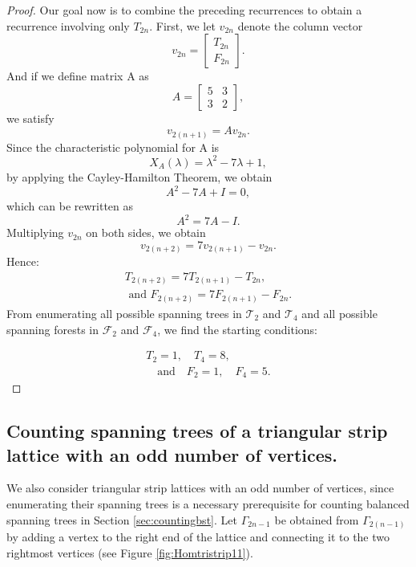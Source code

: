 \documentclass{amsart}
\theoremstyle{definition}
\begin{document}
\begin{proof}
Our goal now is to combine the preceding recurrences to obtain a recurrence involving only $T_{2n}$. First, we let $v_{2n}$ denote the column vector
\[v_{2n} = 
\begin{bmatrix}
    T_{2n} \\
    F_{2n}
\end{bmatrix}.
\]
And if we define matrix A as
\[A = 
\begin{bmatrix}
    5 & 3 \\
    3 & 2
\end{bmatrix},
\]
we satisfy \[v_{2(n+1)}=Av_{2n}.\]
Since the characteristic polynomial for A is \[X_A(\lambda) = \lambda^2 - 7\lambda + 1,\] by applying the Cayley-Hamilton Theorem, we obtain
\[A^2 -7A +I = 0,\] which can be rewritten as
\[A^2 = 7A -I.\]
Multiplying $v_{2n}$ on both sides, we obtain
\[v_{2(n+2)} = 7v_{2(n+1)} - v_{2n}.\]
Hence:
\begin{equation}\label{eqn:recurrencerelationspanningtree} 
    \begin{aligned}
    T_{2(n+2)} = 7T_{2(n+1)} - T_{2n},\\
    \text{ and } F_{2(n+2)} = 7F_{2(n+1)} - F_{2n}.
    \end{aligned}
\end{equation}
From enumerating all possible spanning trees in $\mathscr{T}_2$ and $\mathscr{T}_4$ and all possible spanning forests in $\mathscr{F}_2$ and $\mathscr{F}_4$, we find the starting conditions: 

\begin{equation}\label{eqn:initialvalues1}
    \begin{aligned}
    T_2 = 1, \quad T_4 = 8,\\
    \quad \text{and} \quad
    F_2 = 1, \quad F_4 = 5.
    \end{aligned}
\end{equation}
\end{proof}

\subsection{Counting spanning trees of a triangular strip lattice with an odd number of vertices.}

We also consider triangular strip lattices with an odd number of vertices, since enumerating their spanning trees is a necessary prerequisite for counting balanced spanning trees in Section \ref{sec:countingbst}. Let $\Gamma_{2n-1}$ be obtained from $\Gamma_{2(n-1)}$ by adding a vertex to the right end of the lattice and connecting it to the two rightmost vertices (see Figure \ref{fig:Homtristrip11}). 
\end{document}
